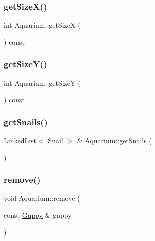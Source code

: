 \mbox{\label{class_aquarium_ab81986af33708a95c309a10a0f317058}} 
\subsubsection{\texorpdfstring{get\+Size\+X()}{getSizeX()}}
{\footnotesize\ttfamily int Aquarium\+::get\+SizeX (\begin{DoxyParamCaption}{ }\end{DoxyParamCaption}) const}

\mbox{\label{class_aquarium_a0384a8e32a1e61baf38e09925ffaed96}} 
\subsubsection{\texorpdfstring{get\+Size\+Y()}{getSizeY()}}
{\footnotesize\ttfamily int Aquarium\+::get\+SizeY (\begin{DoxyParamCaption}{ }\end{DoxyParamCaption}) const}

\mbox{\label{class_aquarium_adae17992a9b26d6918b96159a929d3eb}} 
\subsubsection{\texorpdfstring{get\+Snails()}{getSnails()}}
{\footnotesize\ttfamily \mbox{\hyperlink{class_linked_list}{Linked\+List}}$<$ \mbox{\hyperlink{class_snail}{Snail}} $>$ \& Aquarium\+::get\+Snails (\begin{DoxyParamCaption}{ }\end{DoxyParamCaption})}

\mbox{\label{class_aquarium_a5db51e8b6e5401fcc4140c0c26c049ef}} 
\subsubsection{\texorpdfstring{remove()}{remove()}\hspace{0.1cm}{\footnotesize\ttfamily [1/5]}}
{\footnotesize\ttfamily void Aquarium\+::remove (\begin{DoxyParamCaption}\item[{const \mbox{\hyperlink{class_guppy}{Guppy}} \&}]{guppy }\end{DoxyParamCaption})}

